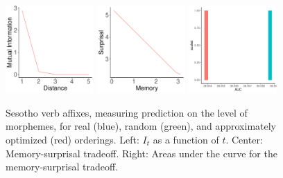 \documentclass[11pt,letterpaper]{article}
\begin{document}
\begin{figure}
\begin{center}
\includegraphics[width=0.3\textwidth]{figures/Sesotho-suffixes-byMorphemes-it-heldout.pdf}
\includegraphics[width=0.3\textwidth]{figures/Sesotho-suffixes-byMorphemes-memsurp-heldout.pdf}
\includegraphics[width=0.3\textwidth]{figures/Sesotho-suffixes-byMorphemes-auc-hist-heldout.pdf}
\end{center}
	\caption{Sesotho verb affixes, measuring prediction on the level of morphemes, for real (blue), random (green), and approximately optimized (red) orderings. Left: $I_t$ as a function of $t$. Center: Memory-surprisal tradeoff. Right: Areas under the curve for the memory-surprisal tradeoff.}\label{fig:jap-morph}
\end{figure}


\end{document}
